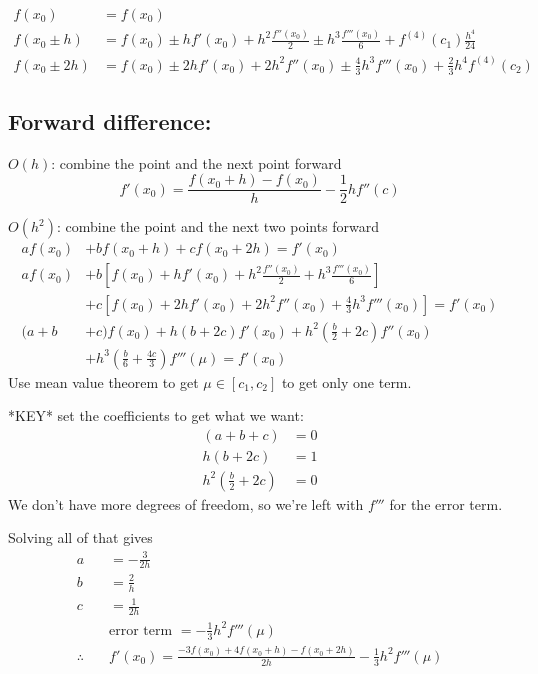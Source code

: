 \documentclass[12pt]{article}
\begin{document}
\begin{align}
f(x_0) &= f(x_0)\\
%
f(x_0 \pm h) &= f(x_0) \pm hf'(x_0) + h^2\frac{f''(x_0)}{2} \pm h^3\frac{f'''(x_0)}{6} + f^{(4)}(c_1)\frac{h^4}{24} \\
%
f(x_0 \pm 2h) &= f(x_0) \pm 2h f'(x_0) + 2 h^2 f''(x_0) \pm \frac{4}{3} h^3 f'''(x_0) + \frac{2}{3}h^4 f^{(4)}(c_2)
\end{align}


\subsection{Forward difference:}
\underline{$O(h)$}: combine the point and the next point forward
\[f'(x_0) = \frac{f(x_0 + h) - f(x_0)}{h} - \frac{1}{2}hf''(c)\]

\underline{$O(h^2)$}: combine the point and the next two points forward
%
\begin{align}
a f(x_0) &+ b f(x_0 + h) + c f(x_0 + 2h) = f'(x_0) \\
%
a f(x_0) &+ b[f(x_0) + hf'(x_0) + h^2\frac{f''(x_0)}{2} + h^3\frac{f'''(x_0)}{6}] \nonumber \\
&+ c[f(x_0) + 2h f'(x_0) + 2 h^2 f''(x_0) + \frac{4}{3} h^3 f'''(x_0)] =f'(x_0) \\
%
(a + b &+ c)f(x_0) + h(b + 2c)f'(x_0) + h^2(\frac{b}{2} + 2c) f''(x_0) \nonumber \\
&+ h^3(\frac{b}{6} +  \frac{4c}{3}) f'''(\mu) = f'(x_0)
\end{align}
%
Use mean value theorem to get $\mu \in [c_1, c_2]$ to get only one term.

*KEY* set the coefficients to get what we want:
%
\begin{align}
(a + b + c) &= 0\\
h(b + 2c) &= 1\\
h^2(\frac{b}{2} + 2c) &= 0
\end{align}
%
We don't have more degrees of freedom, so we're left with $f'''$ for the error term. 

Solving all of that gives
%
\begin{align}
a &= -\frac{3}{2h} \\
b &= \frac{2}{h} \\
c &= \frac{1}{2h} \\
&\text{error term } = -\frac{1}{3}h^2 f'''(\mu) \\
\therefore \quad &\boxed{f'(x_0) = \frac{-3 f(x_0) + 4f(x_0 + h) - f(x_0 + 2h)}{2h} -\frac{1}{3}h^2 f'''(\mu)}
\end{align}
\end{document}

